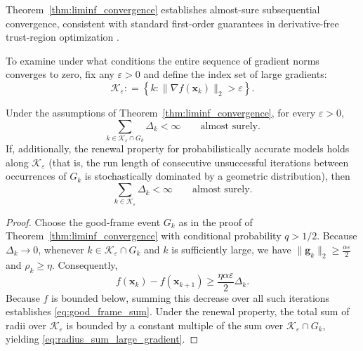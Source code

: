 \documentclass{siamart171218}
\newcommand{\bx}{\bm{x}}
\newcommand{\bg}{\bm{g}}
\providecommand{\coloneqq}{\mathrel{\mathop:}=}
\begin{document}
Theorem~\ref{thm:liminf_convergence} establishes almost-sure subsequential convergence, consistent with standard first-order guarantees in derivative-free trust-region optimization \cite{conn2009introduction,conn2000trust}.

To examine under what conditions the entire sequence of gradient norms converges to zero, fix any $\varepsilon>0$ and define the index set of large gradients:
\begin{equation}
\mathcal K_\varepsilon \coloneqq \left\{ k : \|\nabla f(\bx_k)\|_2 > \varepsilon \right\}.
\end{equation}

\begin{lemma}
\label{lem:radius_sum_large_gradient}
Under the assumptions of Theorem~\ref{thm:liminf_convergence}, for every $\varepsilon>0$,
\begin{equation}
\label{eq:good_frame_sum}
\sum_{k\in\mathcal K_\varepsilon\cap G_k}\Delta_k < \infty \qquad \text{almost surely}.
\end{equation}
If, additionally, the renewal property for probabilistically accurate models holds along $\mathcal K_\varepsilon$ \cite{bandeira2014convergence,Gratton-2017} (that is, the run length of consecutive unsuccessful iterations between occurrences of $G_k$ is stochastically dominated by a geometric distribution), then
\begin{equation}
\label{eq:radius_sum_large_gradient}
\sum_{k\in\mathcal K_\varepsilon}\Delta_k < \infty \qquad \text{almost surely}.
\end{equation}
\end{lemma}

\begin{proof}
Choose the good-frame event $G_k$ as in the proof of Theorem~\ref{thm:liminf_convergence} with conditional probability $q > 1/2$. Because $\Delta_k\to0$, whenever $k\in\mathcal K_\varepsilon\cap G_k$ and $k$ is sufficiently large, we have $\|\bg_k\|_2 \ge \frac{\alpha\varepsilon}{2}$ and $\rho_k\ge\eta$. Consequently,
\[
f(\bx_k)-f(\bx_{k+1}) \ge \frac{\eta\alpha\varepsilon}{2}\Delta_k.
\]
Because $f$ is bounded below, summing this decrease over all such iterations establishes \eqref{eq:good_frame_sum}. Under the renewal property, the total sum of radii over $\mathcal K_\varepsilon$ is bounded by a constant multiple of the sum over $\mathcal K_\varepsilon \cap G_k$, yielding \eqref{eq:radius_sum_large_gradient}.
\end{proof}
\end{document}
